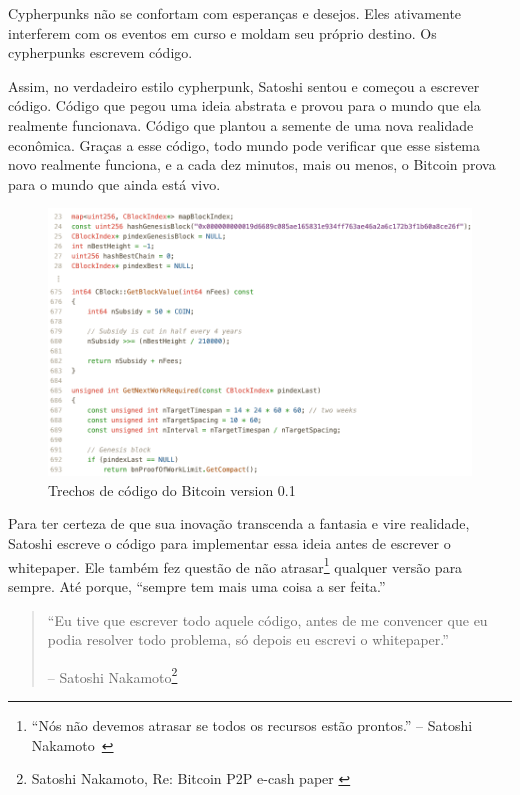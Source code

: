 Cypherpunks não se confortam com esperanças e desejos. Eles ativamente interferem com os eventos em curso e moldam seu próprio destino. Os cypherpunks escrevem código.

Assim, no verdadeiro estilo cypherpunk, Satoshi sentou e começou a escrever código. Código que pegou uma ideia abstrata e provou para o mundo que ela realmente funcionava. Código que plantou a semente de uma nova realidade econômica. Graças a esse código, todo mundo pode verificar que esse sistema novo realmente funciona, e a cada dez minutos, mais ou menos, o Bitcoin prova para o mundo que ainda está vivo.

\begin{figure}
  \includegraphics{assets/images/bitcoin-code-white.png}
  \caption{Trechos de código do Bitcoin version 0.1}
  \label{fig:bitcoin-code-white}
\end{figure}

Para ter certeza de que sua inovação transcenda a fantasia e vire realidade, Satoshi escreve o código para implementar essa ideia antes de escrever o whitepaper. Ele também fez questão de não atrasar\footnote{\enquote{Nós não devemos atrasar se todos os recursos estão prontos.} -- Satoshi Nakamoto~\cite{satoshi-delay}} qualquer versão para sempre. Até porque, \enquote{sempre tem mais uma coisa a ser feita.}

\begin{quotation}\begin{samepage}
\enquote{Eu tive que escrever todo aquele código, antes de me convencer que eu podia resolver todo problema, só depois eu escrevi o whitepaper.} \begin{flushright} -- Satoshi Nakamoto\footnote{Satoshi Nakamoto, Re: Bitcoin P2P e-cash paper \cite{satoshi-mail-code-first}}
\end{flushright}\end{samepage}\end{quotation}

